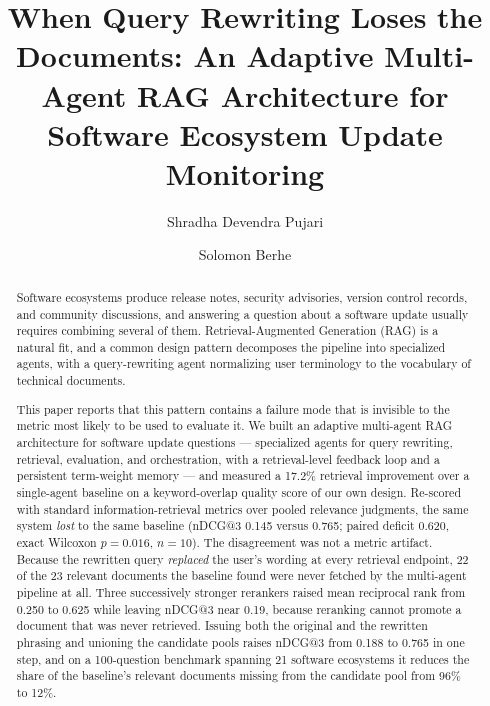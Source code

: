 \documentclass[acmsmall,review,anonymous,screen]{acmart}
\title[When Query Rewriting Loses the Documents]{When Query Rewriting Loses the
Documents: An Adaptive Multi-Agent RAG Architecture for Software Ecosystem
Update Monitoring}
\author{Shradha Devendra Pujari}
\affiliation{%
  \institution{University of the Pacific}
  \department{Department of Computer Science}
  \city{Stockton}
  \state{CA}
  \country{USA}}
\author{Solomon Berhe}
\affiliation{%
  \institution{University of the Pacific}
  \department{Department of Computer Science}
  \city{Stockton}
  \state{CA}
  \country{USA}}
\begin{document}
\begin{abstract}
Software ecosystems produce release notes, security advisories, version control
records, and community discussions, and answering a question about a software
update usually requires combining several of them. Retrieval-Augmented
Generation (RAG) is a natural fit, and a common design pattern decomposes the
pipeline into specialized agents, with a query-rewriting agent normalizing user
terminology to the vocabulary of technical documents.

This paper reports that this pattern contains a failure mode that is invisible
to the metric most likely to be used to evaluate it. We built an adaptive
multi-agent RAG architecture for software update questions --- specialized
agents for query rewriting, retrieval, evaluation, and orchestration, with a
retrieval-level feedback loop and a persistent term-weight memory --- and
measured a 17.2\% retrieval improvement over a single-agent baseline on a
keyword-overlap quality score of our own design. Re-scored with standard
information-retrieval metrics over pooled relevance judgments, the same system
\emph{lost} to the same baseline (nDCG@3 0.145 versus 0.765; paired deficit
0.620, exact Wilcoxon $p=0.016$, $n=10$). The
disagreement was not a metric artifact. Because the rewritten query
\emph{replaced} the user's wording at every retrieval endpoint, 22 of the 23
relevant documents the baseline found were never fetched by the multi-agent
pipeline at all. Three successively stronger rerankers raised mean reciprocal
rank from 0.250 to 0.625 while leaving nDCG@3 near 0.19, because reranking
cannot promote a document that was never retrieved. Issuing both the original
and the rewritten phrasing and unioning the candidate pools raises nDCG@3 from
0.188 to 0.765 in one step, and on a 100-question benchmark spanning 21 software
ecosystems it reduces the share of the baseline's relevant documents missing
from the candidate pool from 96\% to 12\%.


\end{abstract}
\end{document}

